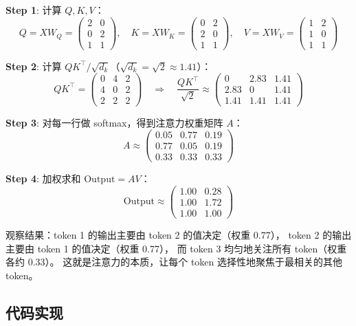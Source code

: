 \textbf{Step 1}: 计算 $Q, K, V$：
\[
Q = XW_Q = \begin{pmatrix} 2 & 0 \\ 0 & 2 \\ 1 & 1 \end{pmatrix}, \quad
K = XW_K = \begin{pmatrix} 0 & 2 \\ 2 & 0 \\ 1 & 1 \end{pmatrix}, \quad
V = XW_V = \begin{pmatrix} 1 & 2 \\ 1 & 0 \\ 1 & 1 \end{pmatrix}
\]

\textbf{Step 2}: 计算 $QK^\top / \sqrt{d_k}$（$\sqrt{d_k} = \sqrt{2} \approx 1.41$）：
\[
QK^\top = \begin{pmatrix} 0 & 4 & 2 \\ 4 & 0 & 2 \\ 2 & 2 & 2 \end{pmatrix}
\quad \Rightarrow \quad
\frac{QK^\top}{\sqrt{2}} \approx \begin{pmatrix} 0 & 2.83 & 1.41 \\ 2.83 & 0 & 1.41 \\ 1.41 & 1.41 & 1.41 \end{pmatrix}
\]

\textbf{Step 3}: 对每一行做 softmax，得到注意力权重矩阵 $A$：
\[
A \approx \begin{pmatrix}
  0.05 & 0.77 & 0.19 \\
  0.77 & 0.05 & 0.19 \\
  0.33 & 0.33 & 0.33
\end{pmatrix}
\]

\textbf{Step 4}: 加权求和 $\mathrm{Output} = AV$：
\[
\mathrm{Output} \approx \begin{pmatrix}
  1.00 & 0.28 \\
  1.00 & 1.72 \\
  1.00 & 1.00
\end{pmatrix}
\]

观察结果：token 1 的输出主要由 token 2 的值决定（权重 0.77），
token 2 的输出主要由 token 1 的值决定（权重 0.77），
而 token 3 均匀地关注所有 token（权重各约 0.33）。
这就是注意力的本质，让每个 token 选择性地聚焦于最相关的其他 token。

\subsection{代码实现}

